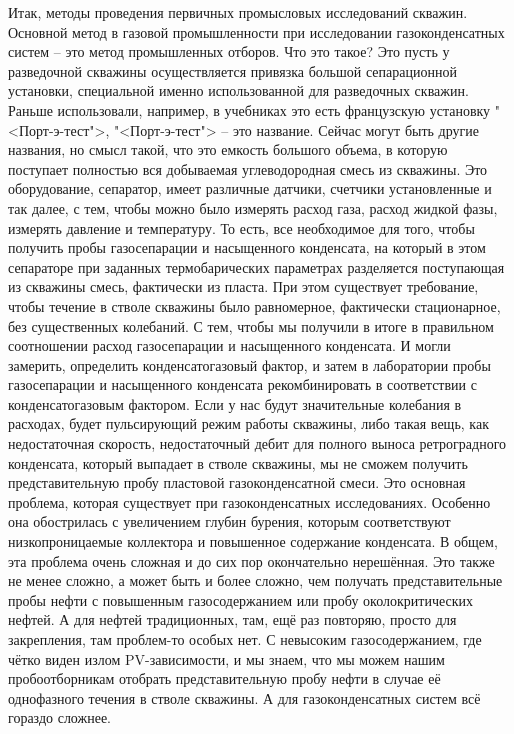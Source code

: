 \documentclass[main.tex]{subfiles}
\begin{document}
Итак, методы проведения первичных промысловых исследований скважин.
Основной метод в газовой промышленности при исследовании газоконденсатных систем -- это метод промышленных отборов.
Что это такое?
Это пусть у разведочной скважины осуществляется привязка большой сепарационной установки, специальной именно использованной для разведочных скважин.
Раньше использовали, например, в учебниках это есть французскую установку "<Порт-э-тест">, "<Порт-э-тест"> -- это название.
Сейчас могут быть другие названия, но смысл такой, что это емкость большого объема, в которую поступает полностью вся добываемая углеводородная смесь из скважины.
Это оборудование, сепаратор, имеет различные датчики, счетчики установленные и так далее, с тем, чтобы можно было измерять расход газа, расход жидкой фазы, измерять давление и температуру.
То есть, все необходимое для того, чтобы получить пробы газосепарации и насыщенного конденсата, на который в этом сепараторе при заданных термобарических параметрах разделяется поступающая из скважины смесь, фактически из пласта.
При этом существует требование, чтобы течение в стволе скважины было равномерное, фактически стационарное, без существенных колебаний.
С тем, чтобы мы получили в итоге в правильном соотношении расход газосепарации и насыщенного конденсата.
И могли замерить, определить конденсатогазовый фактор, и затем в лаборатории пробы газосепарации и насыщенного конденсата рекомбинировать в соответствии с конденсатогазовым фактором.
Если у нас будут значительные колебания в расходах, будет пульсирующий режим работы скважины, либо такая вещь, как недостаточная скорость, недостаточный дебит для полного выноса ретроградного конденсата, который выпадает в стволе скважины, мы не сможем получить представительную пробу пластовой газоконденсатной смеси.
Это основная проблема, которая существует при газоконденсатных исследованиях.
Особенно она обострилась с увеличением глубин бурения, которым соответствуют низкопроницаемые коллектора и повышенное содержание конденсата.
В общем, эта проблема очень сложная и до сих пор окончательно нерешённая.
Это также не менее сложно, а может быть и более сложно, чем получать представительные пробы нефти с повышенным газосодержанием или пробу околокритических нефтей.
А для нефтей традиционных, там, ещё раз повторяю, просто для закрепления, там проблем-то особых нет.
С невысоким газосодержанием, где чётко виден излом PV-зависимости, и мы знаем, что мы можем нашим пробоотборникам отобрать представительную пробу нефти в случае её однофазного течения в стволе скважины.
А для газоконденсатных систем всё гораздо сложнее.
\end{document}
